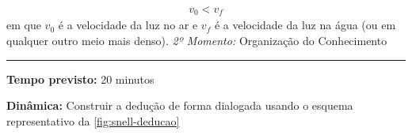     \begin{align}
        v_{0}<v_{f}
    \end{align}
    em que $v_0$ é a velocidade da luz no ar e $v_f$ é a velocidade da luz na água (ou em qualquer outro meio mais denso).
    \newpage
    \bigskip{}
    \noindent\emph{2º Momento:} Organização do Conhecimento
    \par\noindent\rule{.3\textwidth}{.5pt}  
    \par\noindent\textbf{Tempo previsto:} 20 minutos
    \smallskip
    \par\noindent\textbf{Dinâmica:} Construir a dedução de forma dialogada usando o esquema representativo da \autoref{fig:snell-deducao}
    
